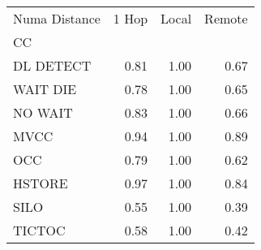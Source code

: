 \begin{tabular}{lrrr}
\toprule
Numa Distance &  1 Hop &  Local &  Remote \\
CC        &        &        &         \\
\midrule
DL DETECT &   0.81 &   1.00 &    0.67 \\
WAIT DIE  &   0.78 &   1.00 &    0.65 \\
NO WAIT   &   0.83 &   1.00 &    0.66 \\
MVCC      &   0.94 &   1.00 &    0.89 \\
OCC       &   0.79 &   1.00 &    0.62 \\
HSTORE    &   0.97 &   1.00 &    0.84 \\
SILO      &   0.55 &   1.00 &    0.39 \\
TICTOC    &   0.58 &   1.00 &    0.42 \\
\bottomrule
\end{tabular}
